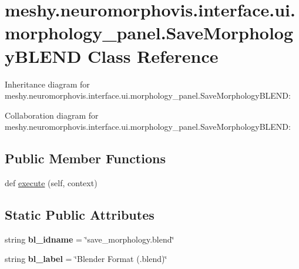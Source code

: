 \hypertarget{classmeshy_1_1neuromorphovis_1_1interface_1_1ui_1_1morphology__panel_1_1SaveMorphologyBLEND}{}\section{meshy.\+neuromorphovis.\+interface.\+ui.\+morphology\+\_\+panel.\+Save\+Morphology\+B\+L\+E\+ND Class Reference}
\label{classmeshy_1_1neuromorphovis_1_1interface_1_1ui_1_1morphology__panel_1_1SaveMorphologyBLEND}


Inheritance diagram for meshy.\+neuromorphovis.\+interface.\+ui.\+morphology\+\_\+panel.\+Save\+Morphology\+B\+L\+E\+ND\+:


Collaboration diagram for meshy.\+neuromorphovis.\+interface.\+ui.\+morphology\+\_\+panel.\+Save\+Morphology\+B\+L\+E\+ND\+:
\subsection*{Public Member Functions}
\begin{DoxyCompactItemize}
\item 
def \hyperlink{classmeshy_1_1neuromorphovis_1_1interface_1_1ui_1_1morphology__panel_1_1SaveMorphologyBLEND_a3c84c7bceb4a6822eaaff97568cd16c9}{execute} (self, context)
\end{DoxyCompactItemize}
\subsection*{Static Public Attributes}
\begin{DoxyCompactItemize}
\item 
string {\bfseries bl\+\_\+idname} = \char`\"{}save\+\_\+morphology.\+blend\char`\"{}\hypertarget{classmeshy_1_1neuromorphovis_1_1interface_1_1ui_1_1morphology__panel_1_1SaveMorphologyBLEND_af51bd44d3f7110986689ca4e976d7ce5}{}\label{classmeshy_1_1neuromorphovis_1_1interface_1_1ui_1_1morphology__panel_1_1SaveMorphologyBLEND_af51bd44d3f7110986689ca4e976d7ce5}

\item 
string {\bfseries bl\+\_\+label} = \char`\"{}Blender Format (.blend)\char`\"{}\hypertarget{classmeshy_1_1neuromorphovis_1_1interface_1_1ui_1_1morphology__panel_1_1SaveMorphologyBLEND_a7213a5c2f6dc3855257ea423797da33f}{}\label{classmeshy_1_1neuromorphovis_1_1interface_1_1ui_1_1morphology__panel_1_1SaveMorphologyBLEND_a7213a5c2f6dc3855257ea423797da33f}

\end{DoxyCompactItemize}


